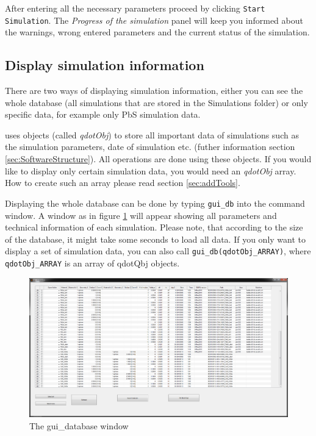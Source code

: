 			After entering all the necessary parameters proceed by clicking \verb|Start Simulation|. The {\it Progress of the simulation} panel will
			keep you informed about the warnings, wrong entered parameters and the current status of the simulation.



		\subsection{Display simulation information} \label{sec:guiDB}
			There are two ways of displaying simulation information, either you can see the whole database  (all simulations
			that are stored in the Simulations folder) or only specific data, for example only PbS simulation data.
			
			\begin{REMARK}
				\software uses objects (called {\it qdotObj}) to store all important data of simulations such as the simulation parameters, date of simulation etc.
				(futher information section \ref{sec:SoftwareStructure}). All operations are done using these objects. If you would like to display only
				certain simulation data, you would need an {\it qdotObj} array. How to create such an array please read section \ref{sec:addTools}.
			\end{REMARK}
			
			Displaying the whole database can be done by typing \verb|gui_db|  into the \matlab command window. A window as in figure \ref{fig:gui_database} will appear
			showing all parameters and technical information of each simulation. Please note, that according to the size of the database, it might take some seconds
			to load all data.
			If you only want to display a set of simulation data, you can also call \verb|gui_db(qdotObj_ARRAY)|, where \verb|qdotObj_ARRAY| is an array of qdotQbj objects.
			
			\begin{figure}[htbp]
				\centering
				\includegraphics[width=\textwidth]{Fig/Scrn_gui_database.png}
				\caption{The gui\_database window}
				\label{fig:gui_database}
			\end{figure}
			
